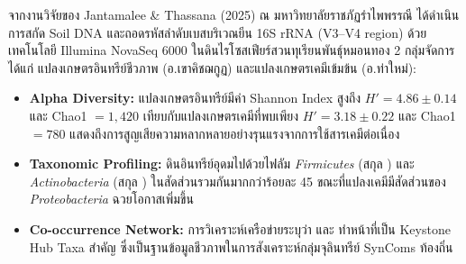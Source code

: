 \begin{application}
จากงานวิจัยของ Jantamalee \& Thassana (2025) \cite{jantamalee_2025} ณ มหาวิทยาลัยราชภัฏรำไพพรรณี ได้ดำเนินการสกัด Soil DNA และถอดรหัสลำดับเบสบริเวณยีน 16S rRNA (V3--V4 region) ด้วยเทคโนโลยี Illumina NovaSeq 6000 ในดินไรโซสเฟียร์สวนทุเรียนพันธุ์หมอนทอง 2 กลุ่มจัดการ ได้แก่ แปลงเกษตรอินทรีย์ชีวภาพ (อ.เขาคิชฌกูฏ) และแปลงเกษตรเคมีเข้มข้น (อ.ท่าใหม่):
\begin{itemize}
    \item \textbf{Alpha Diversity:} แปลงเกษตรอินทรีย์มีค่า Shannon Index สูงถึง $H' = 4.86 \pm 0.14$ และ Chao1 $= 1,420$ เทียบกับแปลงเกษตรเคมีที่พบเพียง $H' = 3.18 \pm 0.22$ และ Chao1 $= 780$ แสดงถึงการสูญเสียความหลากหลายอย่างรุนแรงจากการใช้สารเคมีต่อเนื่อง
    \item \textbf{Taxonomic Profiling:} ดินอินทรีย์อุดมไปด้วยไฟลัม \textit{Firmicutes} (สกุล ) และ \textit{Actinobacteria} (สกุล ) ในสัดส่วนรวมกันมากกว่าร้อยละ 45 ขณะที่แปลงเคมีมีสัดส่วนของ \textit{Proteobacteria} ฉวยโอกาสเพิ่มขึ้น
    \item \textbf{Co-occurrence Network:} การวิเคราะห์เครือข่ายระบุว่า  และ  ทำหน้าที่เป็น Keystone Hub Taxa สำคัญ ซึ่งเป็นฐานข้อมูลชีวภาพในการสังเคราะห์กลุ่มจุลินทรีย์ SynComs ท้องถิ่น
\end{itemize}
\end{application}

